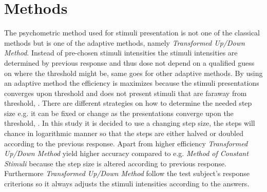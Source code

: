 \section*{Methods}
\label{Methods}
%
The psychometric method used for stimuli presentation is not one of the classical methods but is one of the adaptive methods, namely \textit{Transformed Up/Down Method}. Instead of pre-chosen stimuli intensities the stimuli intensities are determined by previous response and thus dose not depend on a qualified guess on where the threshold might be, same goes for other adaptive methods. By using an adaptive method the efficiency is maximizes because the stimuli presentations converges upon threshold and does not present stimuli that are faraway from threshold, \parencite[p. 287]{PDF:Hearing} . There are different strategies on how to determine the needed step size e.g. it can be fixed or change as the presentations converge upon the threshold, \parencite[p. 22]{PDF:Psychoacoustic}. In this study it is decided to use a changing step size, the steps will chance in logarithmic manner so that the steps are either halved or doubled according to the previous response. Apart from higher efficiency \textit{Transformed Up/Down Method} yield higher accuracy compared to e.g. \textit{Method of Constant Stimuli} because the step size is altered according to previous response. Furthermore \textit{Transformed Up/Down Method} follow the test subject's response criterions so it always adjusts the stimuli intensities according to the answers.  

